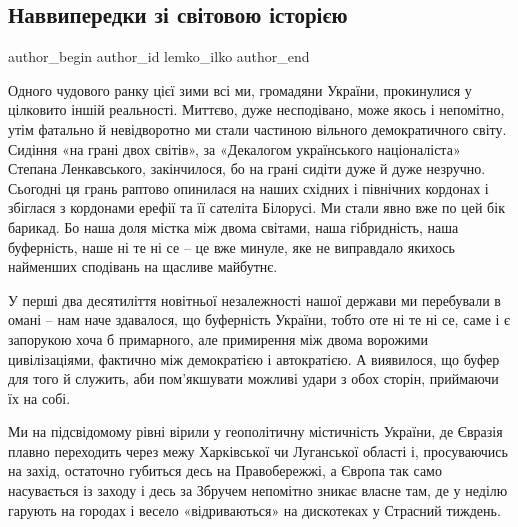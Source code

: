  
 
 
 
 
 
\subsection{Наввипередки зі світовою історією}
\label{sec:15_02_2022.stz.news.ua.zbruc.1.svitova_istoria}
 
\ifcmt
 author_begin
   author_id lemko_ilko
 author_end
\fi

Одного чудового ранку цієї зими всі ми, громадяни України, прокинулися у
цілковито іншій реальності. Миттєво, дуже несподівано, може якось і непомітно,
утім фатально й невідворотно ми стали частиною вільного демократичного світу.
Сидіння «на грані двох світів», за «Декалогом українського націоналіста»
Степана Ленкавського, закінчилося, бо на грані сидіти дуже й дуже незручно.
Сьогодні ця грань раптово опинилася на наших східних і північних кордонах і
збіглася з кордонами ерефії та її сателіта Білорусі. Ми стали явно вже по цей
бік барикад. Бо наша доля містка між двома світами, наша гібридність, наша
буферність, наше ні те ні се – це вже минуле, яке не виправдало якихось
найменших сподівань на щасливе майбутнє.


У перші два десятиліття новітньої незалежності нашої держави ми перебували в
омані – нам наче здавалося, що буферність України, тобто оте ні те ні се, саме
і є запорукою хоча б примарного, але примирення між двома ворожими
цивілізаціями, фактично між демократією і автократією. А виявилося, що буфер
для того й служить, аби пом’якшувати можливі удари з обох сторін, приймаючи їх
на собі.

Ми на підсвідомому рівні вірили у геополітичну містичність України, де Євразія
плавно переходить через межу Харківської чи Луганської області і, просуваючись
на захід, остаточно губиться десь на Правобережжі, а Європа так само
насувається із заходу і десь за Збручем непомітно зникає власне там, де у
неділю гарують на городах і весело «відриваються» на дискотеках у Страсний
тиждень.

